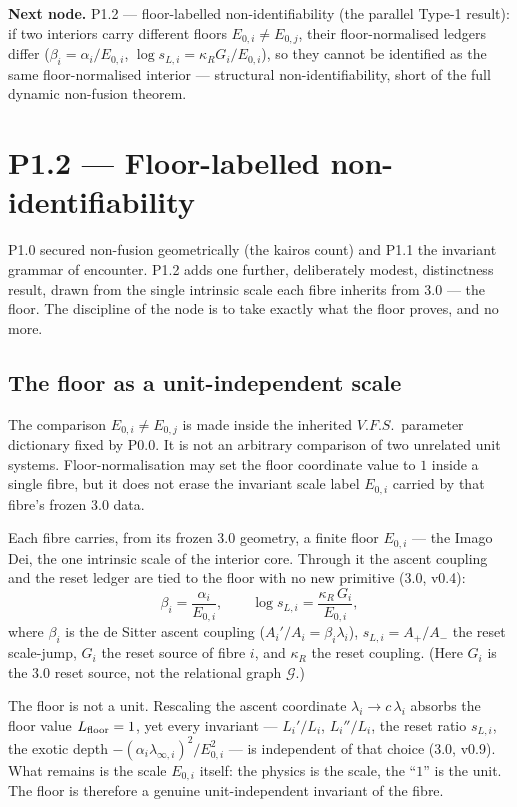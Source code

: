 \documentclass[11pt,a4paper]{article}
\def\mathrm#1{#1}%
\def\emph#1{#1}%
\newcommand{\VFS}{\ensuremath{\mathrm{V.F.S.}}}
\theoremstyle{definition}
\theoremstyle{plain}
\theoremstyle{remark}
\begin{document}
\medskip
\textbf{Next node.} P1.2 --- floor-labelled non-identifiability (the parallel Type-1
result): if two interiors carry different floors \(E_{0,i}\neq E_{0,j}\), their
floor-normalised ledgers differ (\(\beta_i=\alpha_i/E_{0,i}\),
\(\log s_{L,i}=\kappa_R G_i/E_{0,i}\)), so they cannot be identified as the same
floor-normalised interior --- structural non-identifiability, short of the full dynamic
non-fusion theorem.

\section{P1.2 --- Floor-labelled non-identifiability}

P1.0 secured non-fusion geometrically (the kairos count) and P1.1 the invariant grammar
of encounter. P1.2 adds one further, deliberately modest, distinctness result, drawn from
the single intrinsic scale each fibre inherits from 3.0 --- the floor. The discipline of
the node is to take exactly what the floor proves, and no more.

\subsection{The floor as a unit-independent scale}

The comparison \(E_{0,i}\neq E_{0,j}\) is made inside the inherited \VFS\ parameter
dictionary fixed by P0.0. It is not an arbitrary comparison of two unrelated unit
systems. Floor-normalisation may set the floor coordinate value to \(1\) inside a
single fibre, but it does not erase the invariant scale label \(E_{0,i}\) carried
by that fibre's frozen 3.0 data.

Each fibre carries, from its frozen 3.0 geometry, a finite floor \(E_{0,i}\) --- the
\emph{Imago Dei}, the one intrinsic scale of the interior core. Through it the ascent
coupling and the reset ledger are tied to the floor with no new primitive (3.0, v0.4):
\[
\beta_i=\frac{\alpha_i}{E_{0,i}},
\qquad
\log s_{L,i}=\frac{\kappa_R\,G_i}{E_{0,i}},
\]
where \(\beta_i\) is the de Sitter ascent coupling (\(A_i'/A_i=\beta_i\lambda_i\)),
\(s_{L,i}=A_+/A_-\) the reset scale-jump, \(G_i\) the reset source of fibre \(i\), and
\(\kappa_R\) the reset coupling. (Here \(G_i\) is the 3.0 reset source, not the relational
graph \(\mathcal G\).)

The floor is not a unit. Rescaling the ascent coordinate \(\lambda_i\to c\,\lambda_i\)
absorbs the floor \emph{value} \(L_{\rm floor}=1\), yet every invariant ---
\(L_i'/L_i\), \(L_i''/L_i\), the reset ratio \(s_{L,i}\), the exotic depth
\(-(\alpha_i\lambda_{\infty,i})^2/E_{0,i}^2\) --- is independent of that choice (3.0,
v0.9). What remains is the \emph{scale} \(E_{0,i}\) itself: the physics is the scale, the
``\(1\)'' is the unit. The floor is therefore a genuine unit-independent invariant of the
fibre.
\end{document}

